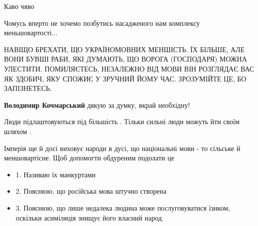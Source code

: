 \begin{itemize}
Каво чяво

 
Чомусь вперто не хочемо позбутись насадженого нам комплексу меньшовартості...

 

НАВІЩО БРЕХАТИ, ЩО УКРАЇНОМОВНИХ МЕНШІСТЬ. ЇХ БІЛЬШЕ, АЛЕ ВОНИ БУВШІ РАБИ, ЯКІ
ДУМАЮТЬ, ЩО ВОРОГА (ГОСПОДАРЯ) МОЖНА УЛЕСТИТИ. ПОМИЛЯЄТЕСЬ, НЕЗАЛЕЖНО ВІД МОВИ
ВІН РОЗГЛЯДАЄ ВАС ЯК ЗДОБИЧ, ЯКУ СПОЖИЄ У ЗРУЧНИЙ ЙОМУ ЧАС. ЗРОЗУМІЙТЕ ЦЕ, БО
ЗАПІЗНЕТЕСЬ.

\begin{itemize}
 
\textbf{Володимир Кочмарський} дякую за думку, вкрай необхідну!
\end{itemize}

 
Люди підлаштовуються під більшість . Тільки сильні люди можуть йти своїм шляхом .

 

Імперія ще й досі виховує народи в дусі, що національні мови - то сільське й меншовартісне. Щоб допомогти обдуреним подолати це

\begin{itemize}
  \item 1. Називаю їх манкуртами
  \item 2. Пояснюю, що російська мова штучно створена
  \item 3. Пояснюю, що лише недалека людина може послуговуватися їзиком, оскільки асиміляція знищує його власний народ.
\end{itemize}



\end{itemize}
